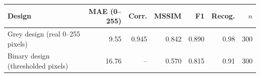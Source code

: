 \begin{tabular}{lrrrrrr}
\hline
Design & MAE (0--255) & Corr. & MSSIM & F1 & Recog. & $n$ \\
\hline
Grey design (real 0--255 pixels) & 9.55 & 0.945 & 0.842 & 0.890 & 0.98 & 300 \\
Binary design (thresholded pixels) & 16.76 & -- & 0.570 & 0.815 & 0.91 & 300 \\
\hline
\end{tabular}
